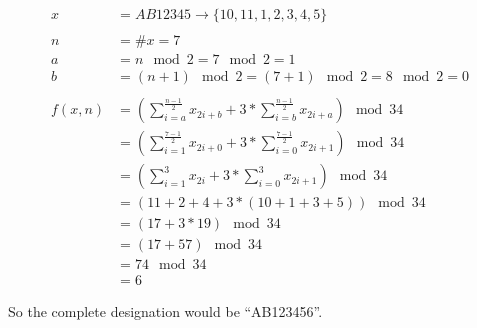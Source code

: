 \begin{align*}
	x &= AB12345 \rightarrow \{10, 11, 1, 2, 3, 4, 5\} \\
	\\
	n &= \#x = 7 \\
	a &= n \mod 2 = 7 \mod 2 = 1 \\
	b &= (n + 1) \mod 2 = (7 + 1) \mod 2 = 8 \mod 2 = 0 \\
	\\
	f(x, n) &= \left( \sum_{i = a}^{\frac{n - 1}{2}} x_{2i + b}
			+ 3 * \sum_{i = b}^{\frac{n - 1}{2}} x_{2i + a} \right)
			\mod 34 \\
		&= \left( \sum_{i = 1}^{\frac{7 - 1}{2}} x_{2i + 0}
			+ 3 * \sum_{i = 0}^{\frac{7 - 1}{2}} x_{2i + 1} \right)
			\mod 34 \\
		&= \left( \sum_{i = 1}^{3} x_{2i}
			+ 3 * \sum_{i = 0}^{3} x_{2i + 1}\right)
			\mod 34 \\
		&= \left( 11 + 2 + 4 + 3 * \left(10 + 1 + 3 + 5 \right) \right) \mod 34 \\
		&= \left( 17 + 3 * 19 \right) \mod 34 \\
		&= \left( 17 + 57 \right) \mod 34 \\
		&= 74 \mod 34 \\
		&= 6
\end{align*}

So the complete designation would be ``AB123456''.
